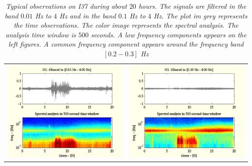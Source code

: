 \documentclass[a4paper, 12pt]{report}
\begin{document}
\begin{table}
\begin{tabular}{cc}
\includegraphics[scale=0.8]{../figures/tempspectanalysisH1LOWI3720140906.pdf}
&
\includegraphics[scale=0.8]{../figures/tempspectanalysisH1HIGHI3720140906.pdf}
\end{tabular}
\begin{center}
\parbox{14 cm}
{
    \caption{\protect\small\it  {Typical observations on I37 during about $20$ hours. The signals are filtered in the band $0.01$ Hz to $4$ Hz and in the band $0.1$ Hz to $4$ Hz. The plot im grey represents the time observations. The color image represents the spectral analysis. The analysis time window is $500$ seconds. A low frequency components appears on the left figures. A common frequency component appears around the frequency band $[0.2-0.3]$ Hz}}
    \label {fig:tempspectanalysisI3720140905}
}
\end{center}
\end{table}
\end{document}
